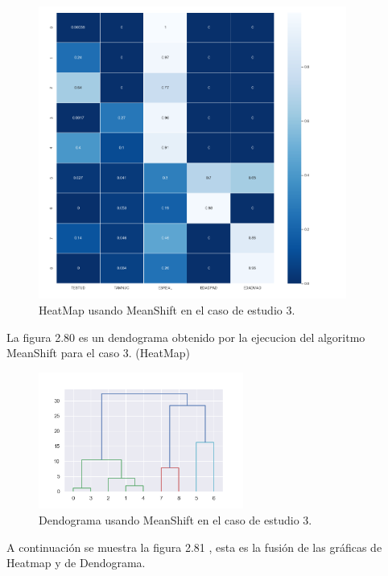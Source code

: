 	\begin{figure}[htb]
		\centering
		\includegraphics[width=0.9\textwidth]{./imagenes/caso3/heatmap_caso3_MeanShift}
		\caption{HeatMap usando MeanShift en el caso de estudio 3.} \label{fig:1}
	\end{figure}


	La figura 2.80 es un dendograma obtenido por la ejecucion del algoritmo MeanShift para
	el caso 3. (HeatMap) \\

	\begin{figure}[htb]
		\centering
		\includegraphics[width=0.6\textwidth]{./imagenes/caso3/dendograma_caso3_MeanShift}
		\caption{Dendograma usando MeanShift en el caso de estudio 3.} \label{fig:1}
	\end{figure}

	A continuación se muestra la figura 2.81 , esta es la fusión de las gráficas de 
	Heatmap y de Dendograma.  \\

